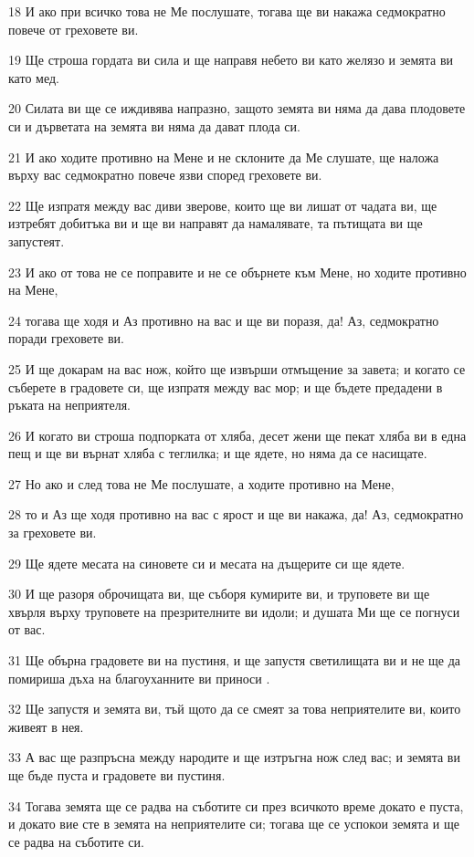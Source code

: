 \par 18 И ако при всичко това не Ме послушате, тогава ще ви накажа седмократно повече от греховете ви.
\par 19 Ще строша гордата ви сила и ще направя небето ви като желязо и земята ви като мед.
\par 20 Силата ви ще се иждивява напразно, защото земята ви няма да дава плодовете си и дърветата на земята ви няма да дават плода си.
\par 21 И ако ходите противно на Мене и не склоните да Ме слушате, ще наложа върху вас седмократно повече язви според греховете ви.
\par 22 Ще изпратя между вас диви зверове, които ще ви лишат от чадата ви, ще изтребят добитъка ви и ще ви направят да намалявате, та пътищата ви ще запустеят.
\par 23 И ако от това не се поправите и не се обърнете към Мене, но ходите противно на Мене,
\par 24 тогава ще ходя и Аз противно на вас и ще ви поразя, да! Аз, седмократно поради греховете ви.
\par 25 И ще докарам на вас нож, който ще извърши отмъщение за завета; и когато се съберете в градовете си, ще изпратя между вас мор; и ще бъдете предадени в ръката на неприятеля.
\par 26 И когато ви строша подпорката от хляба, десет жени ще пекат хляба ви в една пещ и ще ви върнат хляба с теглилка; и ще ядете, но няма да се насищате.
\par 27 Но ако и след това не Ме послушате, а ходите противно на Мене,
\par 28 то и Аз ще ходя противно на вас с ярост и ще ви накажа, да! Аз, седмократно за греховете ви.
\par 29 Ще ядете месата на синовете си и месата на дъщерите си ще ядете.
\par 30 И ще разоря оброчищата ви, ще съборя кумирите ви, и труповете ви ще хвърля върху труповете на презрителните ви идоли; и душата Ми ще се погнуси от вас.
\par 31 Ще обърна градовете ви на пустиня, и ще запустя светилищата ви и не ще да помириша дъха на благоуханните ви приноси .
\par 32 Ще запустя и земята ви, тъй щото да се смеят за това неприятелите ви, които живеят в нея.
\par 33 А вас ще разпръсна между народите и ще изтръгна нож след вас; и земята ви ще бъде пуста и градовете ви пустиня.
\par 34 Тогава земята ще се радва на съботите си през всичкото време докато е пуста, и докато вие сте в земята на неприятелите си; тогава ще се успокои земята и ще се радва на съботите си.
